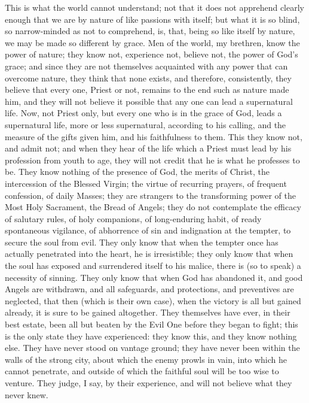This is what the world cannot understand; not that it does not
apprehend clearly enough that we are by nature of like passions with
itself; but what it is so blind, so narrow-minded as not to
comprehend, is, that, being so like itself by nature, we may be made
so different by grace. Men of the world, my brethren, know the power
of nature; they know not, experience not, believe not, the power of
God's grace; and since they are not themselves acquainted with any
power that can overcome nature, they think that none exists, and
therefore, consistently, they believe that every one, Priest or not,
remains to the end such as nature made him, and they will not believe
it possible that any one can lead a supernatural life. Now, not Priest
only, but every one who is in the grace of God, leads a supernatural
life, more or less supernatural, according to his calling, and the
measure of the gifts given him, and his faithfulness to them. This
they know not, and admit not; and when they hear of the life which a
Priest must lead by his profession from youth to age, they will not
credit that he is what he professes to be. They know nothing of the
presence of God, the merits of Christ, the intercession of the Blessed
Virgin; the virtue of recurring prayers, of frequent confession, of
daily Masses; they are strangers to the transforming power of the Most
Holy Sacrament, the Bread of Angels; they do not contemplate the
efficacy of salutary rules, of holy companions, of long-enduring
habit, of ready spontaneous vigilance, of abhorrence of sin and
indignation at the tempter, to secure the soul from evil. They only
know that when the tempter once has actually penetrated into the
heart, he is irresistible; they only know that when the soul has
exposed and surrendered itself to his malice, there is (so to speak) a
necessity of sinning. They only know that when God has abandoned it,
and good Angels are withdrawn, and all safeguards, and protections,
and preventives are neglected, that then (which is their own case),
when the victory is all but gained already, it is sure to be gained
altogether. They themselves have ever, in their best estate, been all
but beaten by the Evil One before they began to fight; this is the
only state they have experienced: they know this, and they know
nothing else. They have never stood on vantage ground; they have never
been within the walls of the strong city, about which the enemy prowls
in vain, into which he cannot penetrate, and outside of which the
faithful soul will be too wise to venture. They judge, I say, by their
experience, and will not believe what they never knew.

